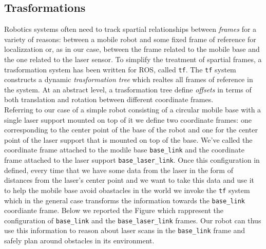 \subsection*{Trasformations}
Robotics systems often need to track spartial relationships between \textit{frames}
for a variety of reasons: between a mobile robot and some fixed frame of reference 
for localizzation or, as in our case, between the frame related to the mobile base 
and the one related to the laser sensor. To simplify the treatment of spartial frames,
a trasformation system has been written for ROS, called \texttt{tf}. The \texttt{tf} system 
constructs a dynamic \textit{trasformation tree} which realtes all frames of reference 
in the system. At an abstract level, a trasformation tree define \textit{offsets}
in terms of both translation and rotation between different coordinate frames.
\\
Referring to our case of a simple robot consisting of a circular mobile base
with a single laser support mounted on top of it we define two coordinate
frames: one corresponding to the center point of the base of the robot and one
for the center point of the laser support that is mounted on top of the base.
We've called the coordinate frame attached to the modile base \texttt{base\_link}
and the coordinate frame attached to the laser support \texttt{base\_laser\_link}.
Once this configuration in defined, every time that we have some data from the laser 
in the form of distances from the laser's center point and we want to take this data 
and use it to help the mobile base avoid obastacles in the world we invoke the \texttt{tf}
system which in the general case transforms the information towards the \texttt{base\_link}
coordiante frame. Below we reported the Figure which rappresent the configuration of 
\texttt{base\_link} and the \texttt{base\_laser\_link} frames.
Our robot can thus use this information to reason about laser scans in
the \texttt{base\_link} frame and safely plan around obstacles in its environment.

